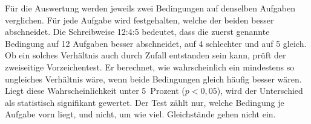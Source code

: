 Für die Auswertung werden jeweils zwei Bedingungen auf denselben Aufgaben verglichen. Für jede Aufgabe wird festgehalten, welche der beiden besser abschneidet. Die Schreibweise 12:4:5 bedeutet, dass die zuerst genannte Bedingung auf 12 Aufgaben besser abschneidet, auf 4 schlechter und auf 5 gleich. Ob ein solches Verhältnis auch durch Zufall entstanden sein kann, prüft der zweiseitige Vorzeichentest. Er berechnet, wie wahrscheinlich ein mindestens so ungleiches Verhältnis wäre, wenn beide Bedingungen gleich häufig besser wären. Liegt diese Wahrscheinlichkeit unter 5~Prozent ($p < 0{,}05$), wird der Unterschied als statistisch signifikant gewertet. Der Test zählt nur, welche Bedingung je Aufgabe vorn liegt, und nicht, um wie viel. Gleichstände gehen nicht ein.

